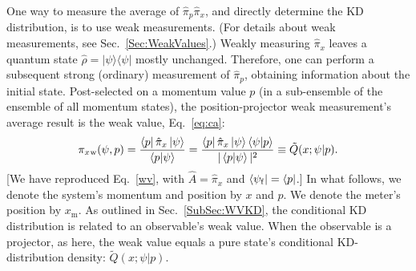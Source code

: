 \documentclass[%
 reprint,
superscriptaddress,
nofootinbib,
bibnotes,
 amsmath,amssymb,
 aps,
]{revtex4-1}
\theoremstyle{plain}
\newcommand*{\ketbra}[2]{\lvert #1 \rangle\!\langle #2 \rvert}
\begin{document}
One way to measure the average of $\hat{\pi}_{p}\hat{\pi}_{x}$, and
directly determine the KD distribution, is to use weak measurements.
(For details about weak measurements, see Sec.~\ref{Sec:WeakValues}.)
Weakly measuring $\hat{\pi}_{x}$ leaves a quantum state $\hat{\rho} = \ketbra{\psi}{\psi}  $ 
mostly unchanged. Therefore, one can perform a subsequent strong (ordinary) measurement of 
$\hat{\pi}_{p}$, obtaining information about the initial state. Post-selected on a momentum value $p$ (in a sub-ensemble of the ensemble of all momentum states), 
the position-projector weak measurement's average result is the weak value, Eq.~\eqref{eq:ca}:
\begin{equation}
\pi_{x}{}_{\mathrm{w}} (\psi, p) =\frac{\left\langle p\right|\hat{\pi}_{x}\left|\psi\right\rangle }{\left\langle p|\psi\right\rangle } = \frac{\left\langle p\right|\hat{\pi}_{x}\left|\psi\right\rangle \braket{\psi | p} }{|\left\langle p|\psi\right\rangle |^2} \equiv \tilde{Q}(x;\psi|p) 
. \label{eq:weak_value_KD}
\end{equation}
[We have reproduced Eq.~\eqref{wv}, with $\hat{A} = \hat{\pi}_x$ and $\bra{\psi_{\mathrm{f}}} = \bra{p}$.] In what follows, we  denote the 
system's momentum and position by $x$ and $p$. We denote the meter's position by $x_{\mathrm{m}}$. As outlined in Sec.~\ref{SubSec:WVKD}, the conditional KD distribution is related to an observable's weak value. When the observable is a projector, as here, the weak value equals a pure state's conditional KD-distribution density: $\tilde{Q}(x;\psi|p)$. 
\end{document}
